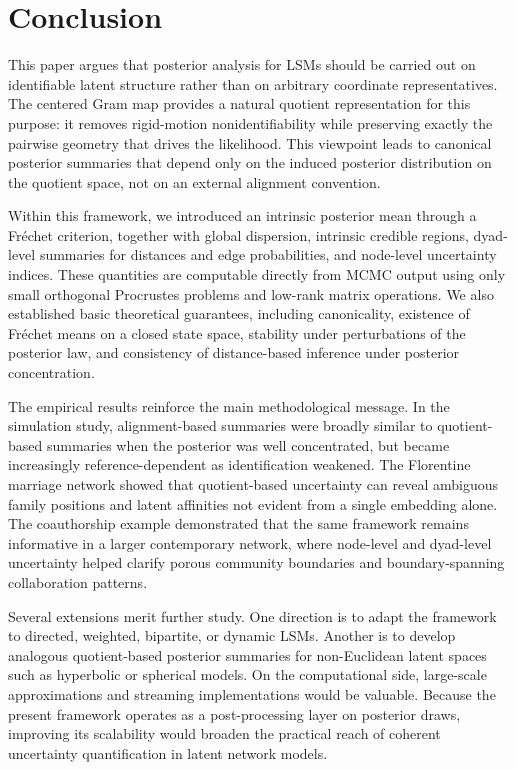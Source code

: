 \documentclass[12pt]{article}
\newcommand{\Frechet}{Fr\'{e}chet\xspace}
\begin{document}
\section{Conclusion}\label{sec:conclusion}

This paper argues that posterior analysis for LSMs should be carried out on
identifiable latent structure rather than on arbitrary coordinate representatives. The centered Gram
map provides a natural quotient representation for this purpose: it removes rigid-motion
nonidentifiability while preserving exactly the pairwise geometry that drives the likelihood. This
viewpoint leads to canonical posterior summaries that depend only on the induced posterior
distribution on the quotient space, not on an external alignment convention.

Within this framework, we introduced an intrinsic posterior mean through a \Frechet criterion,
together with global dispersion, intrinsic credible regions, dyad-level summaries for distances and
edge probabilities, and node-level uncertainty indices. These quantities are computable directly
from MCMC output using only small orthogonal Procrustes problems and low-rank matrix operations. We
also established basic theoretical guarantees, including canonicality, existence of \Frechet means
on a closed state space, stability under perturbations of the posterior law, and consistency of
distance-based inference under posterior concentration.

The empirical results reinforce the main methodological message. In the simulation study,
alignment-based summaries were broadly similar to quotient-based summaries when the posterior was
well concentrated, but became increasingly reference-dependent as identification weakened. The
Florentine marriage network showed that quotient-based uncertainty can reveal ambiguous family
positions and latent affinities not evident from a single embedding alone. The coauthorship example
demonstrated that the same framework remains informative in a larger contemporary network, where
node-level and dyad-level uncertainty helped clarify porous community boundaries and boundary-spanning
collaboration patterns.

Several extensions merit further study. One direction is to adapt the framework to directed,
weighted, bipartite, or dynamic LSMs. Another is to develop analogous quotient-based
posterior summaries for non-Euclidean latent spaces such as hyperbolic or spherical models. On the
computational side, large-scale approximations and streaming implementations would be valuable.
Because the present framework operates as a post-processing layer on posterior draws, improving its
scalability would broaden the practical reach of coherent uncertainty quantification in latent
network models.
\end{document}
